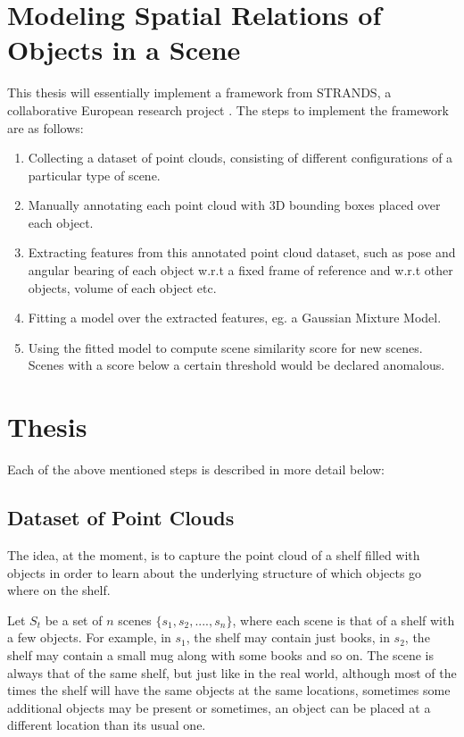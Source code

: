 \documentclass[12pt]{article}
\begin{document}
\section{Modeling Spatial Relations of Objects in a Scene}

This thesis will essentially implement a framework from STRANDS, a collaborative European research project \cite{STRANDS}. The steps to implement the framework are as follows:

\begin{enumerate}
\item{Collecting a dataset of point clouds, consisting of different configurations of a particular type of scene.}
\item{Manually annotating each point cloud with 3D bounding boxes placed over each object.}
\item{Extracting features from this annotated point cloud dataset, such as pose and angular bearing of each object w.r.t a fixed frame of reference and w.r.t other objects, volume of each object etc.}
\item{Fitting a model over the extracted features, eg. a Gaussian Mixture Model.}
\item{Using the fitted model to compute scene similarity score for new scenes. Scenes with a score below a certain threshold would be declared anomalous.}
\end{enumerate}





\section{Thesis}

Each of the above mentioned steps is described in more detail below:

\subsection{Dataset of Point Clouds}

The idea, at the moment, is to capture the point cloud of a shelf filled with objects in order to learn about the underlying structure of which objects go where on the shelf. 

Let $S_t$ be a set of $n$ scenes $\{s_1, s_2,...., s_n\}$, where each scene is that of a shelf with a few objects. For example, in $s_1$, the shelf may contain just books, in $s_2$, the shelf may contain a small mug along with some books and so on. The scene is always that of the same shelf, but just like in the real world, although most of the times the shelf will have the same objects at the same locations, sometimes some additional objects may be present or sometimes, an object can be placed at a different location than its usual one.
\end{document}
